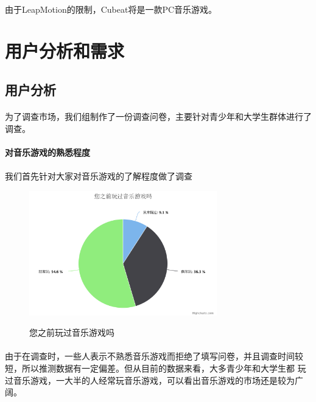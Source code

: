 \documentclass{article}
\begin{document}
\paragraph{}
由于LeapMotion的限制，Cubeat将是一款PC音乐游戏。
\newpage
\section{用户分析和需求}
\subsection{用户分析}
\paragraph{}
为了调查市场，我们组制作了一份调查问卷，主要针对青少年和大学生群体进行了调查。
\paragraph{对音乐游戏的熟悉程度}
\paragraph{}
我们首先针对大家对音乐游戏的了解程度做了调查
\begin{figure}[H]
  \centering
  \includegraphics[width=22em]{chart1.png}\\
  \caption{您之前玩过音乐游戏吗}\label{2-1}
\end{figure}
\paragraph{}
由于在调查时，一些人表示不熟悉音乐游戏而拒绝了填写问卷，并且调查时间较短，所以推测数据有一定偏差。但从目前的数据来看，大多青少年和大学生都
玩过音乐游戏，一大半的人经常玩音乐游戏，可以看出音乐游戏的市场还是较为广阔。
\end{document}
